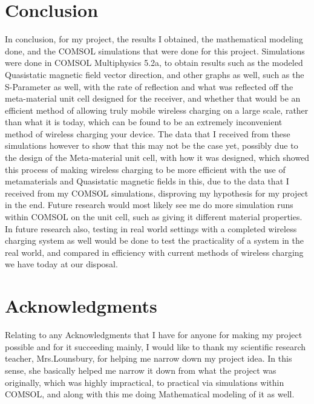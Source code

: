 \documentclass[]{article}
\begin{document}
\section*{Conclusion}
In conclusion, for my project, the results I obtained, the mathematical modeling done, and the COMSOL simulations that were done for this project. Simulations were done in COMSOL Multiphysics 5.2a, to obtain results such as the modeled Quasistatic magnetic field vector direction, and other graphs as well, such as the S-Parameter as well, with the rate of reflection and what was reflected off the meta-material unit cell designed for the receiver, and whether that would be an efficient method of allowing truly mobile wireless charging on a large scale, rather than what it is today, which can be found to be an extremely inconvenient method of wireless charging your device. The data that I received from these simulations however to show that this may not be the case yet, possibly due to the design of the Meta-material unit cell, with how it was designed, which showed this process of making wireless charging to be more efficient with the use of metamaterials and Quasistatic magnetic fields in this, due to the data that I received from my COMSOL simulations, disproving my hypothesis for my project in the end. Future research would most likely see me do more simulation runs within COMSOL on the unit cell, such as giving it different material properties. In future research also, testing in real world settings with a completed wireless charging system as well would be done to test the practicality of a system in the real world, and compared in efficiency with current methods of wireless charging we have today at our disposal.
\section*{Acknowledgments}
Relating to any Acknowledgments that I have for anyone for making my project possible and for it succeeding mainly, I would like to thank my scientific research teacher, Mrs.Lounsbury, for helping me narrow down my project idea. In this sense, she basically helped me narrow it down from what the project was originally, which was highly impractical, to practical via simulations within COMSOL, and along with this me doing Mathematical modeling of it as well. 
\end{document}
